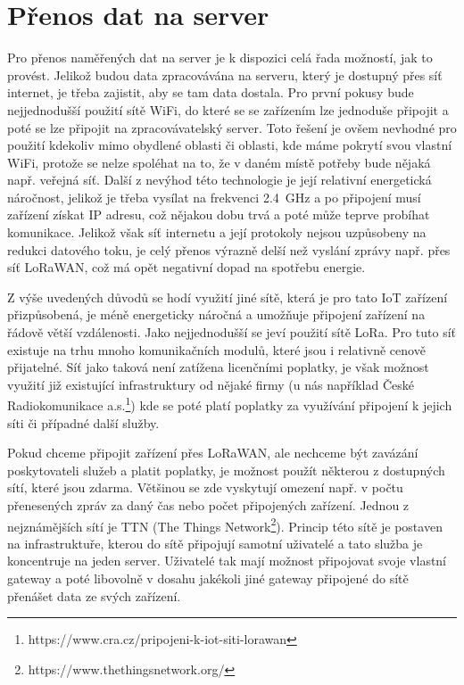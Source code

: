 \section{Přenos dat na server}

Pro přenos naměřených dat na server je k dispozici celá řada možností, jak to provést. Jelikož budou data zpracovávána na serveru, který je dostupný přes síť internet, je třeba zajistit, aby se tam data dostala. Pro první pokusy bude nejjednodušší použití sítě WiFi, do které se se zařízením lze jednoduše připojit a poté se lze připojit na zpracovávatelský server. Toto řešení je ovšem nevhodné pro použití kdekoliv mimo obydlené oblasti či oblasti, kde máme pokrytí svou vlastní WiFi, protože se nelze spoléhat na to, že v daném místě potřeby bude nějaká např. veřejná síť. Další z nevýhod této technologie je její relativní energetická náročnost, jelikož je třeba vysílat na frekvenci \SI{2,4}{\giga\hertz} a po připojení musí zařízení získat IP adresu, což nějakou dobu trvá a poté může teprve probíhat komunikace. Jelikož však síť internetu a její protokoly nejsou uzpůsobeny na redukci datového toku, je celý přenos výrazně delší než vyslání zprávy např. přes síť LoRaWAN, což má opět negativní dopad na spotřebu energie.

Z výše uvedených důvodů se hodí využití jiné sítě, která je pro tato IoT zařízení přizpůsobená, je méně energeticky náročná a umožňuje připojení zařízení na řádově větší vzdálenosti. Jako nejjednodušší se jeví použití sítě LoRa. Pro tuto síť existuje na trhu mnoho komunikačních modulů, které jsou i relativně cenově přijatelné. Síť jako taková není zatížena licenčními poplatky, je však možnost využití již existující infrastruktury od nějaké firmy (u nás například České Radiokomunikace a.s.\footnote{https://www.cra.cz/pripojeni-k-iot-siti-lorawan}) kde se poté platí poplatky za využívání připojení k jejich síti či případné další služby.

Pokud chceme připojit zařízení přes LoRaWAN, ale nechceme být zavázání poskytovateli služeb a platit poplatky, je možnost použít některou z dostupných sítí, které jsou zdarma. Většinou se zde vyskytují omezení např. v počtu přenesených zpráv za daný čas nebo počet připojených zařízení. Jednou z nejznámějších sítí je TTN (The Things Network\footnote{https://www.thethingsnetwork.org/}). Princip této sítě je postaven na infrastruktuře, kterou do sítě připojují samotní uživatelé a tato služba je koncentruje na jeden server. Uživatelé tak mají možnost připojovat svoje vlastní gateway a poté libovolně v dosahu jakékoli jiné gateway připojené do sítě přenášet data ze svých zařízení.

